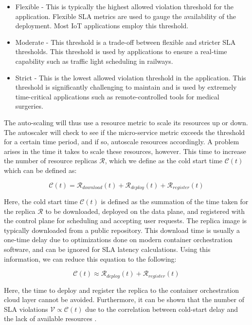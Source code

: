 \begin{itemize}
    \item Flexible - This is typically the highest allowed violation threshold for the application. Flexible SLA metrics are used to gauge the availability of the deployment. Most IoT applications employ this threshold.
    \item Moderate - This threshold is a trade-off between flexible and stricter SLA thresholds. This threshold is used by applications to ensure a real-time capability such as traffic light scheduling in railways.
    \item Strict - This is the lowest allowed violation threshold in the application. This threshold is significantly challenging to maintain and is used by extremely time-critical applications such as remote-controlled tools for medical surgeries.
\end{itemize}

The auto-scaling will thus use a resource metric to scale its resources up or down. The autoscaler will check to see if the micro-service metric exceeds the threshold for a certain time period, and if so, autoscale resources accordingly. A problem arises in the time it takes to scale these resources, however. This time to increase the number of resource replicas $\mathcal{R}$, which we define as the cold start time $\mathcal{C}(t)$ which can be defined as:

\begin{equation}
    \mathcal{C}(t) = \mathcal{R}_{download}(t) + \mathcal{R}_{deploy}(t) + \mathcal{R}_{register}(t)
\end{equation}

Here, the cold start time $\mathcal{C}(t)$ is defined as the summation of the time taken for the replica $\mathcal{R}$ to be downloaded, deployed on the data plane, and registered with the control plane for scheduling and accepting user requests. The replica image is typically downloaded from a public repository. This download time is usually a one-time delay due to optimizations done on modern container orchestration software, and can be ignored for SLA latency calculations. Using this information, we can reduce this equation to the following:

\begin{equation}
    \mathcal{C}(t) \approx \mathcal{R}_{deploy}(t) + \mathcal{R}_{register}(t)
\end{equation}


Here, the time to deploy and register the replica to the container orchestration cloud layer cannot be avoided. Furthermore, it can be shown that the number of SLA violations $\mathcal{V} \propto \mathcal{C}(t)$ due to the correlation between cold-start delay and the lack of available resources \cite{patel2021systematic}.\par

